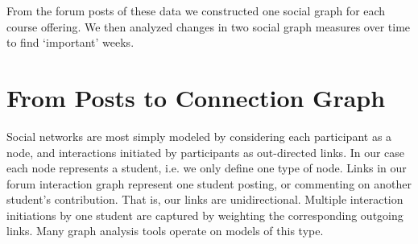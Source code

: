 
From the forum posts of these data we constructed one social graph for
each course offering. We then analyzed changes in two social graph
measures over time to find `important' weeks.

\section{From Posts to Connection Graph}

Social networks are most simply modeled by considering each
participant as a node, and interactions initiated by participants as
out-directed links. In our case each node represents a student,
i.e. we only define one type of node. Links in our forum interaction
graph represent one student posting, or commenting on another
student's contribution. That is, our links are
unidirectional. Multiple interaction initiations by one student are
captured by weighting the corresponding outgoing links. Many graph
analysis tools operate on models of this type.

